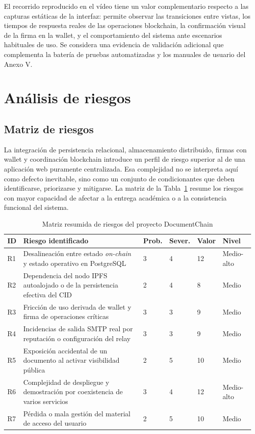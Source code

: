 \documentclass[11pt, a4paper]{article}
\begin{document}
El recorrido reproducido en el vídeo tiene un valor complementario respecto a las capturas estáticas de la interfaz: permite observar las transiciones entre vistas, los tiempos de respuesta reales de las operaciones blockchain, la confirmación visual de la firma en la wallet, y el comportamiento del sistema ante escenarios habituales de uso. Se considera una evidencia de validación adicional que complementa la batería de pruebas automatizadas y los manuales de usuario del Anexo V.

\section{Análisis de riesgos}

\subsection{Matriz de riesgos}

La integración de persistencia relacional, almacenamiento distribuido, firmas con wallet y coordinación blockchain introduce un perfil de riesgo superior al de una aplicación web puramente centralizada. Esa complejidad no se interpreta aquí como defecto inevitable, sino como un conjunto de condicionantes que deben identificarse, priorizarse y mitigarse. La matriz de la Tabla~\ref{tab:matriz-riesgos-memoria} resume los riesgos con mayor capacidad de afectar a la entrega académica o a la consistencia funcional del sistema.

\begin{table}[H]
    \centering
    \small
    \begin{tabular}{|p{0.9cm}|p{5.2cm}|p{1.9cm}|p{1.9cm}|p{1.4cm}|p{1.9cm}|}
    \hline
    \textbf{ID} & \textbf{Riesgo identificado} & \textbf{Prob.} & \textbf{Sever.} & \textbf{Valor} & \textbf{Nivel} \\
    \hline
    R1 & Desalineación entre estado \textit{on-chain} y estado operativo en PostgreSQL & 3 & 4 & 12 & Medio-alto \\
    \hline
    R2 & Dependencia del nodo IPFS autoalojado o de la persistencia efectiva del CID & 2 & 4 & 8 & Medio \\
    \hline
    R3 & Fricción de uso derivada de wallet y firma de operaciones críticas & 3 & 3 & 9 & Medio \\
    \hline
    R4 & Incidencias de salida SMTP real por reputación o configuración del relay & 3 & 3 & 9 & Medio \\
    \hline
    R5 & Exposición accidental de un documento al activar visibilidad pública & 2 & 5 & 10 & Medio \\
    \hline
    R6 & Complejidad de despliegue y demostración por coexistencia de varios servicios & 3 & 4 & 12 & Medio-alto \\
    \hline
    R7 & Pérdida o mala gestión del material de acceso del usuario & 2 & 5 & 10 & Medio \\
    \hline
    \end{tabular}
    \caption{Matriz resumida de riesgos del proyecto DocumentChain}
    \label{tab:matriz-riesgos-memoria}
\end{table}
\end{document}
